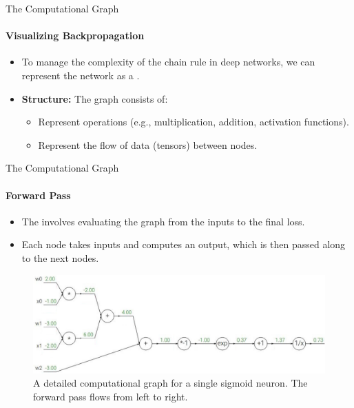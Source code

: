 \begin{frame}{The Computational Graph}
    \framesubtitle{Visualizing Backpropagation}
    \begin{itemize}
        \item To manage the complexity of the chain rule in deep networks, we can represent the network as a .
        \item \textbf{Structure:} The graph consists of:
        \begin{itemize}
            \item {} Represent operations (e.g., multiplication, addition, activation functions).
            \item {} Represent the flow of data (tensors) between nodes.
        \end{itemize}
    \end{itemize}
\end{frame}

\begin{frame}{The Computational Graph}
    \framesubtitle{Forward Pass}
    \begin{itemize}
        \item The  involves evaluating the graph from the inputs to the final loss.
        \item Each node takes inputs and computes an output, which is then passed along to the next nodes.
    \end{itemize}
    \begin{figure}
        \centering
        \includegraphics[width=0.9\linewidth]{images/computational_graph_sigmoid.png}
        \caption{A detailed computational graph for a single sigmoid neuron. The forward pass flows from left to right.}
    \end{figure}
\end{frame}


